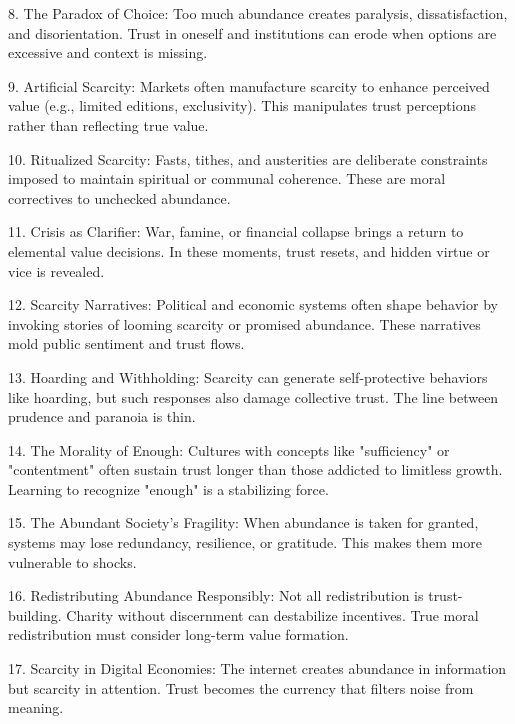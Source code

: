 \documentclass[11pt,oneside]{book}
\begin{document}
8. The Paradox of Choice: Too much abundance creates paralysis, dissatisfaction, and disorientation. Trust in oneself and institutions can erode when options are excessive and context is missing.



9. Artificial Scarcity: Markets often manufacture scarcity to enhance perceived value (e.g., limited editions, exclusivity). This manipulates trust perceptions rather than reflecting true value.



10. Ritualized Scarcity: Fasts, tithes, and austerities are deliberate constraints imposed to maintain spiritual or communal coherence. These are moral correctives to unchecked abundance.



11. Crisis as Clarifier: War, famine, or financial collapse brings a return to elemental value decisions. In these moments, trust resets, and hidden virtue or vice is revealed.



12. Scarcity Narratives: Political and economic systems often shape behavior by invoking stories of looming scarcity or promised abundance. These narratives mold public sentiment and trust flows.



13. Hoarding and Withholding: Scarcity can generate self-protective behaviors like hoarding, but such responses also damage collective trust. The line between prudence and paranoia is thin.



14. The Morality of Enough: Cultures with concepts like "sufficiency" or "contentment" often sustain trust longer than those addicted to limitless growth. Learning to recognize "enough" is a stabilizing force.



15. The Abundant Society’s Fragility: When abundance is taken for granted, systems may lose redundancy, resilience, or gratitude. This makes them more vulnerable to shocks.



16. Redistributing Abundance Responsibly: Not all redistribution is trust-building. Charity without discernment can destabilize incentives. True moral redistribution must consider long-term value formation.



17. Scarcity in Digital Economies: The internet creates abundance in information but scarcity in attention. Trust becomes the currency that filters noise from meaning.
\end{document}
